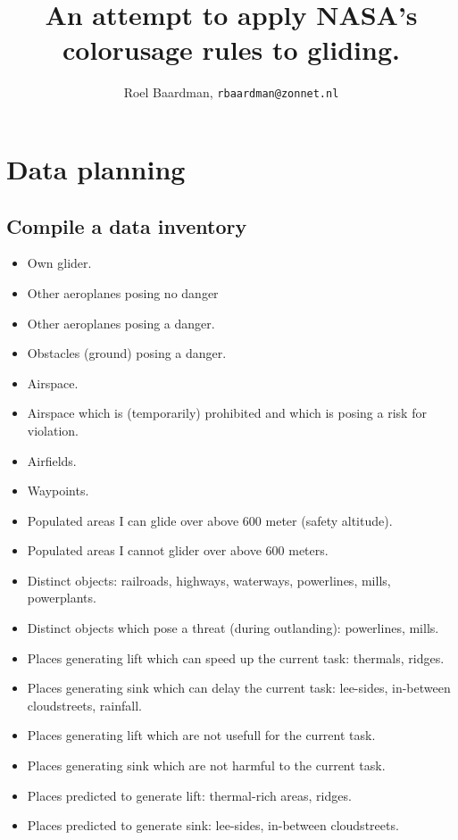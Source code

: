 \documentclass{article}
\begin{document}
\title{An attempt to apply NASA's colorusage rules to gliding.}
\author{Roel Baardman, \nolinkurl{rbaardman@zonnet.nl}}
\maketitle
\newpage
\tableofcontents
\newpage

\section{Data planning}
\subsection{Compile a data inventory}
\begin{itemize}
\item Own glider.
\item Other aeroplanes posing no danger
\item Other aeroplanes posing a danger.
\item Obstacles (ground) posing a danger.
\item Airspace.
\item Airspace which is (temporarily) prohibited and which is posing a risk for violation.
\item Airfields.
\item Waypoints.
\item Populated areas I can glide over above 600 meter (safety altitude).
\item Populated areas I cannot glider over above 600 meters.
\item Distinct objects: railroads, highways, waterways, powerlines, mills, powerplants.
\item Distinct objects which pose a threat (during outlanding): powerlines, mills.
\item Places generating lift which can speed up the current task: thermals, ridges.
\item Places generating sink which can delay the current task: lee-sides, in-between cloudstreets, rainfall.
\item Places generating lift which are not usefull for the current task.
\item Places generating sink which are not harmful to the current task.
\item Places predicted to generate lift: thermal-rich areas, ridges.
\item Places predicted to generate sink: lee-sides, in-between cloudstreets.
\end{itemize}
\end{document}
